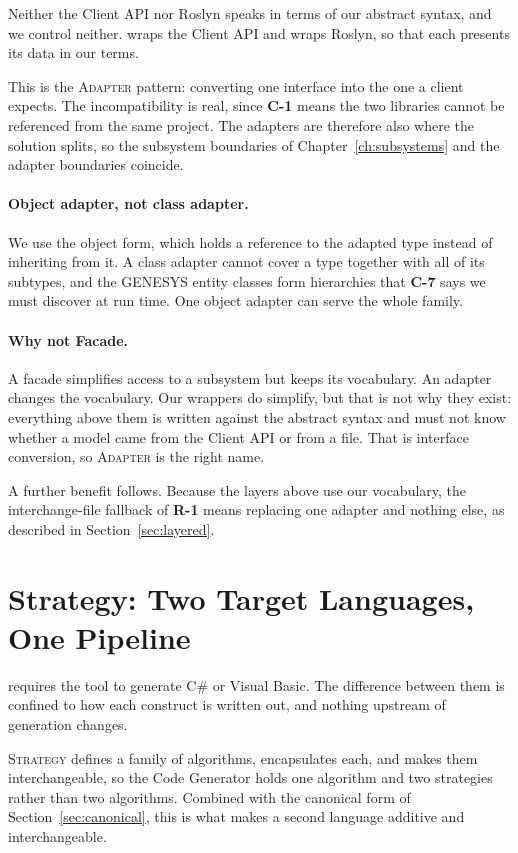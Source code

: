 Neither the Client API nor Roslyn speaks in terms of our abstract syntax, and we
control neither.  wraps the Client API and
 wraps Roslyn, so that each presents its data in our
terms.

This is the \textsc{Adapter} pattern: converting one interface into the one a
client expects. The incompatibility is real, since \textbf{C-1} means the two
libraries cannot be referenced from the same project. The adapters are therefore
also where the solution splits, so the subsystem boundaries of
Chapter~\ref{ch:subsystems} and the adapter boundaries coincide.

\paragraph{Object adapter, not class adapter.}
We use the object form, which holds a reference to the adapted type instead of
inheriting from it. A class adapter cannot cover a type together with all of its
subtypes, and the GENESYS entity classes form hierarchies that \textbf{C-7} says
we must discover at run time. One object adapter can serve the whole family.

\paragraph{Why not Facade.}
A facade simplifies access to a subsystem but keeps its vocabulary. An adapter
changes the vocabulary. Our wrappers do simplify, but that is not why they
exist: everything above them is written against the abstract syntax and must not
know whether a model came from the Client API or from a file. That is interface
conversion, so \textsc{Adapter} is the right name.

A further benefit follows. Because the layers above use our vocabulary, the
interchange-file fallback of \textbf{R-1} means replacing one adapter and
nothing else, as described in Section~\ref{sec:layered}.

\section{Strategy: Two Target Languages, One Pipeline}

 requires the tool to generate C\# or Visual Basic. The difference
between them is confined to how each construct is written out, and nothing
upstream of generation changes.

\textsc{Strategy} defines a family of algorithms, encapsulates each, and makes
them interchangeable, so the Code Generator holds one algorithm and two
strategies rather than two algorithms. Combined with the canonical form of
Section~\ref{sec:canonical}, this is what makes a second language additive
and interchangeable.


